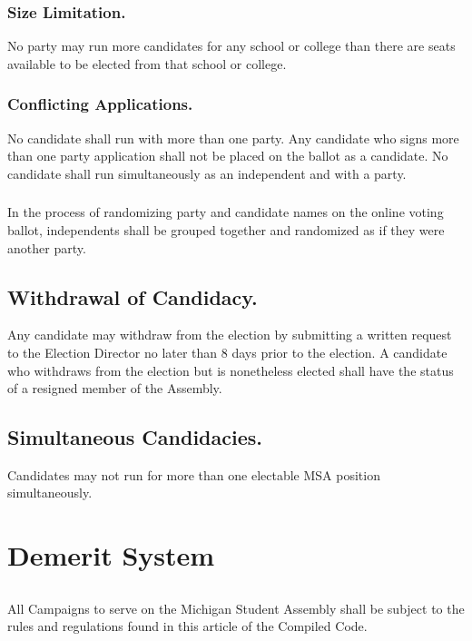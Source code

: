 \subsubsection{Size Limitation.}
No party may run more candidates for any school or college than there are seats available to be elected from that school or college.

\subsubsection{Conflicting Applications.}
No candidate shall run with more than one party.  Any candidate who signs more than one party application shall not be placed on the ballot as a candidate. No candidate shall run simultaneously as an independent and with a party.

\subsubsection{}
In the process of randomizing party and candidate names on the online voting ballot, independents shall be grouped together and randomized as if they were another party.

\subsection{Withdrawal of Candidacy.}
Any candidate may withdraw from the election by submitting a written request to the Election Director no later than 8 days prior to the election.  A candidate who withdraws from the election but is nonetheless elected shall have the status of a resigned member of the Assembly.

\subsection{Simultaneous Candidacies.}
Candidates may not run for more than one electable MSA position simultaneously.


\section{Demerit System}

\subsection{}
All Campaigns to serve on the Michigan Student Assembly shall be subject to the rules and regulations found in this article of the Compiled Code.

